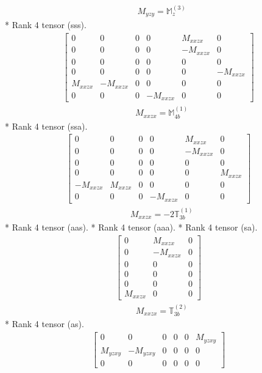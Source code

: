 \documentclass[fleqn,8pt,landscape]{jsarticle}
\begin{document}
\begin{align*}
& M_{yzy} = \mathbb{M}_{z}^{(3)}
\end{align*}
* Rank 4 tensor (sss).
\begin{align*}
\begin{bmatrix} 0 & 0 & 0 & 0 & M_{xxzx} & 0 \\ 0 & 0 & 0 & 0 & - M_{xxzx} & 0 \\ 0 & 0 & 0 & 0 & 0 & 0 \\ 0 & 0 & 0 & 0 & 0 & - M_{xxzx} \\ M_{xxzx} & - M_{xxzx} & 0 & 0 & 0 & 0 \\ 0 & 0 & 0 & - M_{xxzx} & 0 & 0 \end{bmatrix}
\end{align*}
\begin{align*}
& M_{xxzx} = \mathbb{M}_{4b}^{(1)}
\end{align*}
* Rank 4 tensor (ssa).
\begin{align*}
\begin{bmatrix} 0 & 0 & 0 & 0 & M_{xxzx} & 0 \\ 0 & 0 & 0 & 0 & - M_{xxzx} & 0 \\ 0 & 0 & 0 & 0 & 0 & 0 \\ 0 & 0 & 0 & 0 & 0 & M_{xxzx} \\ - M_{xxzx} & M_{xxzx} & 0 & 0 & 0 & 0 \\ 0 & 0 & 0 & - M_{xxzx} & 0 & 0 \end{bmatrix}
\end{align*}
\begin{align*}
& M_{xxzx} = - 2 \mathbb{T}_{3b}^{(1)}
\end{align*}
* Rank 4 tensor (aas).
* Rank 4 tensor (aaa).
* Rank 4 tensor (sa).
\begin{align*}
\begin{bmatrix} 0 & M_{xxzx} & 0 \\ 0 & - M_{xxzx} & 0 \\ 0 & 0 & 0 \\ 0 & 0 & 0 \\ 0 & 0 & 0 \\ M_{xxzx} & 0 & 0 \end{bmatrix}
\end{align*}
\begin{align*}
& M_{xxzx} = \mathbb{T}_{3b}^{(2)}
\end{align*}
* Rank 4 tensor (as).
\begin{align*}
\begin{bmatrix} 0 & 0 & 0 & 0 & 0 & M_{yzxy} \\ M_{yzxy} & - M_{yzxy} & 0 & 0 & 0 & 0 \\ 0 & 0 & 0 & 0 & 0 & 0 \end{bmatrix}
\end{align*}
\end{document}
